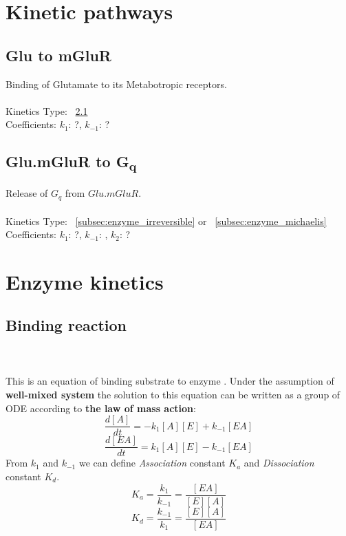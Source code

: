 \documentclass[twoside,twocolumn]{article}
\begin{document}
\section{Kinetic pathways}
\subsection{Glu to mGluR}
Binding of Glutamate to its Metabotropic receptors.
\\
\\Kinetics Type: ~\ref{subsec:enzyme_binding}
\\Coefficients: $k_{1}$: ?, $k_{-1}$: ? 

\subsection{Glu.mGluR to \texorpdfstring{G\textsubscript{q}}{Gq}}
Release of $G_{q}$ from $Glu.mGluR$.
\\
\\Kinetics Type: ~\ref{subsec:enzyme_irreversible} or ~\ref{subsec:enzyme_michaelis}
\\Coefficients: $k_{1}$: ?, $k_{-1}$: , $k_{2}$: ? 

\section{Enzyme kinetics}
\subsection{Binding reaction}
\label{subsec:enzyme_binding}
\\\\This is an equation of binding substrate to enzyme \cite[p.~135]{sterratt_principles_2011}. Under the assumption of \textbf{well-mixed system}\cite[p.~135]{sterratt_principles_2011} the solution to this equation can be written as a group of ODE according to \textbf{the law of mass action}\cite[p.~10]{bisswanger_enzyme_2002}:
\[ \frac{d[A]}{dt} = -k_{1}[A][E] + k_{-1}[EA]\]
\[ \frac{d[EA]}{dt} = k_{1}[A][E] - k_{-1}[EA]\]
From $k_{1}$ and $k_{-1}$ we can define \textit{Association} constant $K_{a}$ and \textit{Dissociation} constant $K_{d}$.
\[ K_{a} = \frac{k_{1}}{k_{-1}} = \frac{[EA]}{[E][A]} \]
\[ K_{d} = \frac{k_{-1}}{k_{1}} = \frac{[E][A]}{[EA]} \]
\end{document}
